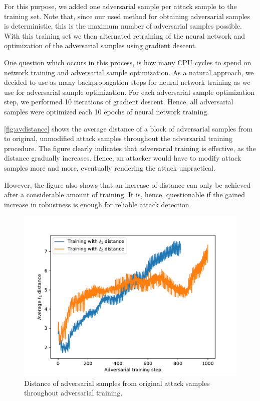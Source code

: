 \documentclass[conference]{IEEEtran}
\begin{document}
For this purpose, we added one adversarial sample per attack sample to the training set. Note that, since our used method for obtaining adversarial samples is deterministic, this is the maximum number of adversarial samples possible. With this training set we then alternated retraining of the neural network and optimization of the adversarial samples using gradient descent.

One question which occurs in this process, is how many CPU cycles to spend on network training and adversarial sample optimization. As a natural approach, we decided to use as many backpropagation steps for neural network training as we use for adversarial sample optimization.  For each adversarial sample optimization step, we performed 10 iterations of gradient descent. Hence, all adversarial samples were optimized each 10 epochs of neural network training.

\autoref{fig:avdistance} shows the average distance of a block of adversarial samples from to original, unmodified attack samples throughout the adversarial training procedure. The figure clearly indicates that adversarial training is effective, as the distance gradually increases. Hence, an attacker would have to modify attack samples more and more, eventually rendering the attack unpractical.

However, the figure also shows that an increase of distance can only be achieved after a considerable amount of training. It is, hence, questionable if the gained increase in robustness is enough for reliable attack detection.

\begin{figure}
\includegraphics[width=\columnwidth]{../plots/adv_training/avdistance.pdf}
\caption{Distance of adversarial samples from original attack samples throughout adversarial training.}
\label{fig:avdistance}
\end{figure}
\end{document}
